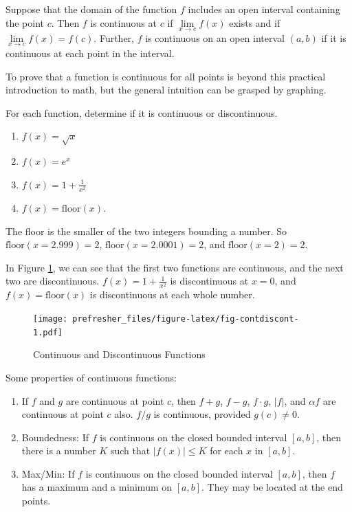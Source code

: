 \documentclass[]{book}
\providecommand{\tightlist}{%
  \setlength{\itemsep}{0pt}\setlength{\parskip}{0pt}}
\theoremstyle{definition}
\theoremstyle{definition}
\theoremstyle{definition}
\theoremstyle{remark}
\let\BeginKnitrBlock\begin \let\EndKnitrBlock\end
\begin{document}
\BeginKnitrBlock{definition}[Continuity]
\protect\hypertarget{def:unnamed-chunk-7}{}{\label{def:unnamed-chunk-7}
{} }Suppose that the domain of the function
\(f\) includes an open interval containing the point \(c\). Then \(f\)
is continuous at \(c\) if \(\lim\limits_{x \to c} f(x)\) exists and if
\(\lim\limits_{x \to c} f(x)=f(c)\). Further, \(f\) is continuous on an
open interval \((a,b)\) if it is continuous at each point in the
interval.
\EndKnitrBlock{definition}

To prove that a function is continuous for all points is beyond this
practical introduction to math, but the general intuition can be grasped
by graphing.

\BeginKnitrBlock{example}[Continuous and Discontinuous Functions]
\protect\hypertarget{exm:contdiscont}{}{\label{exm:contdiscont}
{} } For each
function, determine if it is continuous or discontinuous.

\begin{enumerate}
\def\labelenumi{\arabic{enumi}.}
\tightlist
\item
  \(f(x) = \sqrt{x}\)
\item
  \(f(x) = e^x\)
\item
  \(f(x) = 1 + \frac{1}{x^2}\)
\item
  \(f(x) = \text{floor}(x)\).
\end{enumerate}

The floor is the smaller of the two integers bounding a number. So
\(\text{floor}(x = 2.999) = 2\), \(\text{floor}(x = 2.0001) = 2\), and
\(\text{floor}(x = 2) = 2.\)
\EndKnitrBlock{example}

\BeginKnitrBlock{solution}
{}In Figure \ref{fig:fig-contdiscont}, we can
see that the first two functions are continuous, and the next two are
discontinuous. \(f(x) = 1 + \frac{1}{x^2}\) is discontinuous at
\(x= 0\), and \(f(x) = \text{floor}(x)\) is discontinuous at each whole
number.
\EndKnitrBlock{solution}

\begin{figure}
\centering
\texttt{[image: prefresher\_files/figure-latex/fig-contdiscont-1.pdf]}
\caption{\label{fig:fig-contdiscont}Continuous and Discontinuous Functions}
\end{figure}

Some properties of continuous functions:

\begin{enumerate}
\def\labelenumi{\arabic{enumi}.}
\tightlist
\item
  If \(f\) and \(g\) are continuous at point \(c\), then \(f+g\),
  \(f-g\), \(f \cdot g\), \(|f|\), and \(\alpha f\) are continuous at
  point \(c\) also. \(f/g\) is continuous, provided \(g(c)\ne 0\).
\item
  Boundedness: If \(f\) is continuous on the closed bounded interval
  \([a,b]\), then there is a number \(K\) such that \(|f(x)|\le K\) for
  each \(x\) in \([a,b]\).
\item
  Max/Min: If \(f\) is continuous on the closed bounded interval
  \([a,b]\), then \(f\) has a maximum and a minimum on \([a,b]\). They
  may be located at the end points.
\end{enumerate}
\end{document}

